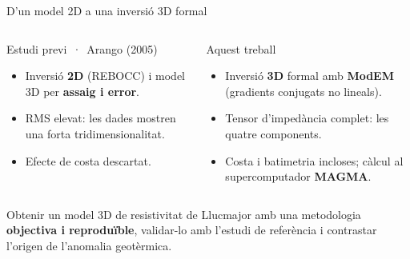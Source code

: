 \documentclass[10pt,aspectratio=169,t]{beamer}
\begin{document}
\begin{frame}{D'un model 2D a una inversió 3D formal}
\begin{columns}[T,onlytextwidth]
    \begin{caixa}[muted]{Estudi previ \,·\, Arango (2005)}
      \begin{itemize}
        \item Inversió \textbf{2D} (REBOCC) i model 3D per \textbf{assaig i error}.
        \item RMS elevat: les dades mostren una forta tridimensionalitat.
        \item Efecte de costa descartat.
      \end{itemize}
    \end{caixa}
    \begin{caixa}[accent]{Aquest treball}
      \begin{itemize}
        \item Inversió \textbf{3D} formal amb \textbf{ModEM} (gradients conjugats no lineals).
        \item Tensor d'impedància complet: les quatre components.
        \item Costa i batimetria incloses; càlcul al supercomputador \textbf{MAGMA}.
      \end{itemize}
    \end{caixa}
\end{columns}
\vspace{0.3cm}
\begin{nota}[rho5]
  \par\vspace{2pt}
  {\normalsize Obtenir un model 3D de resistivitat de Llucmajor amb una metodologia \textbf{objectiva i reproduïble},
  validar-lo amb l'estudi de referència i contrastar l'origen de l'anomalia geotèrmica.}
\end{nota}
\end{frame}
\end{document}
